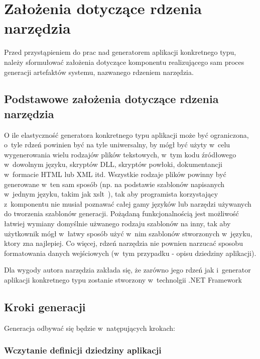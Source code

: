 \chapter{Założenia dotyczące rdzenia narzędzia} \label{chap:implementation:core}

Przed przystąpieniem do prac nad generatorem aplikacji konkretnego typu, należy sformułować założenia dotyczące komponentu realizującego sam proces generacji artefaktów systemu, nazwanego rdzeniem narzędzia.



\section{Podstawowe założenia dotyczące rdzenia narzędzia} \label{sec:core:basic_requirements}

O ile elastyczność generatora konkretnego typu aplikacji może być ograniczona, o~tyle rdzeń powinien być na tyle uniwersalny, by mógł być użyty w~celu wygenerowania wielu rodzajów plików tekstowych, w~tym kodu źródłowego w~dowolnym języku, skryptów DLL, skryptów powłoki, dokumentancji w~formacie HTML lub XML itd.
Wszystkie rodzaje plików powinny być generowane w~ten sam sposób (np. na podstawie szablonów napisanych w~jednym języku, takim jak xslt~\cite{xslt}), tak aby programista korzystający z~komponentu nie musiał poznawać całej gamy języków lub narzędzi używanych do tworzenia szablonów generacji.
Pożądaną funkcjonalnością jest możliwość łatwiej wymiany domyślnie użwanego rodzaju szablonów na inny, tak aby użytkownik mógł w~łatwy sposób użyć w~nim szablonów stworzonych w~języku, ktory zna najlepiej.
Co więcej, rdzeń narzędzia nie pownien narzucać sposobu formatowania danych wejściowych (w~tym przypadku - opisu dziedziny aplikacji).

Dla wygody autora narzędzia zakłada się, że zarówno jego rdzeń jak i~generator aplikacji konkretnego typu zostanie stworzony w~technolgii .NET Framework



\section{Kroki generacji} \label{sec:generation_steps}

Generacja odbywać się będzie w~natępujących krokach:


\subsection{Wczytanie definicji dziedziny aplikacji}

